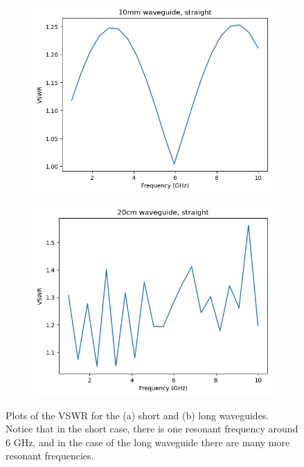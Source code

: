 \begin{figure}
	\centering
	\begin{subfigure}{0.4\textwidth}
		\includegraphics[scale=0.5]{images/plots/short-finiteconductivity.png}
		\caption{}
		\label{short-finiteconductivity}
	\end{subfigure}
	\hspace{2cm}
	\begin{subfigure}{0.4\textwidth}
		\includegraphics[scale=0.5]{images/plots/long-finiteconductivity.png}
		\caption{}
		\label{long-finiteconductivity}
	\end{subfigure}
	\caption{Plots of the VSWR for the (a) short and (b) long waveguides. Notice that in the short case,
	there is one resonant frequency around 6 GHz, and in the case of the long waveguide there are many more
	resonant frequencies.}
	\label{straight-waveguides}
\end{figure}
 
